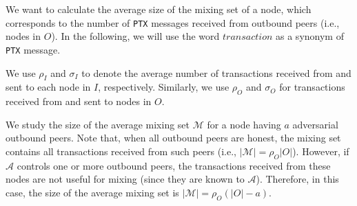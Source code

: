 \documentclass{article}
\begin{document}
	We want to calculate the average size of the mixing set of a node, which corresponds to the number of \texttt{PTX} messages received from outbound peers (i.e., nodes in $O$).
	In the following, we will use the word $transaction$ as a synonym of \texttt{PTX} message. 
	
	We use $\rho_I$ and $\sigma_I$ to denote the average number of transactions received from and sent to each node in $I$, respectively.
	Similarly, we use $\rho_O$ and $\sigma_O$ for transactions received from and sent to nodes in $O$.
	
	We study the size of the average mixing set $\mathcal{M}$ for a node having $a$ adversarial outbound peers.
	Note that, when all outbound peers are honest, the mixing set contains all transactions received from such peers (i.e., $|\mathcal{M}| = \rho_O|O|$).
	However, if $\mathcal{A}$ controls one or more outbound peers, the transactions received from these nodes are not useful for mixing (since they are known to $\mathcal{A}$).
	Therefore, in this case, the size of the average mixing set is $|\mathcal{M}| = \rho_O(|O|-a)$.
	
\end{document}
